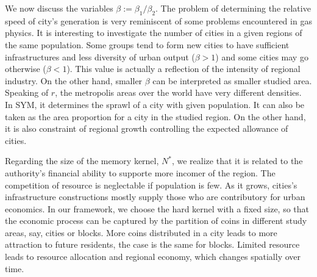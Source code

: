 \documentclass[reprint,unsortedaddress,amsmath,amssymb,aps,prl,showkeys]{revtex4-2}
\begin{document}
We now discuss the variables $\beta:=\beta_1/\beta_2$. The problem of determining the relative speed of city's generation is very reminiscent of some problems encountered in gas physics. It is interesting to investigate the number of cities in a given regions of the same population. Some groups tend to form new cities to have sufficient infrastructures and less diversity of urban output ($\beta > 1$) and some cities may go otherwise ($\beta< 1$). This value is actually a reflection of the intensity of regional industry. On the other hand, smaller $\beta$ can be interpreted as smaller studied area. Speaking of $r$, the metropolis areas over the world have very different densities. In SYM, it determines the sprawl of a city with given population. It can also be taken as the area proportion for a city in the studied region. On the other hand, it is also constraint of regional growth controlling the expected allowance of cities. %

Regarding the size of the memory kernel, $N^*$, we realize that it is related to the authority's financial ability to supporte more incomer of the region. The competition of resource is neglectable if population is few. As it grows, cities's infrastructure constructions mostly supply those who are contributory for urban economics. In our framework, we choose the hard kernel with a fixed size, so that the economic process can be captured by the partition of coins in different study areas, say, cities or blocks. More coins distributed in a city leads to more attraction to future residents, the case is the same for blocks. Limited resource leads to resource allocation and regional economy, which changes spatially over time. 
\end{document}
